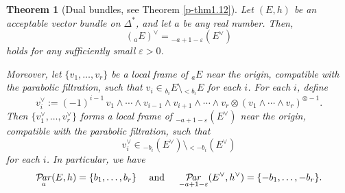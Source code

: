 \documentclass[12pt,twoside]{amsart}
\DeclareMathOperator{\Par}{\mathcal{P}\!\it{ar}}
\newtheorem{thm}{Theorem}[section]
\theoremstyle{definition}
\begin{document}
\begin{thm}[Dual bundles, see Theorem \ref{p-thm1.12}]\label{p-thm13.2}
Let $(E, h)$ be an acceptable vector bundle on $\Delta^*$, 
and let $a$ be any real number. Then,
\[
\left({}_a E\right)^\vee = {}_{-a + 1 - \varepsilon}\left(E^\vee\right)
\]
holds for any sufficiently small $\varepsilon > 0$. 

Moreover, let $\{v_1, \ldots, v_r\}$ be a local frame of ${}_a E$ near the origin, 
compatible with the parabolic filtration, such that 
$v_i \in {}_{b_i} E \setminus {}_{<b_i} E$ for each $i$. 
For each $i$, define
\begin{equation}\label{p-eq13.1}
v_i^\vee := (-1)^{i-1} \, v_1 \wedge 
\cdots \wedge v_{i-1} \wedge v_{i+1} \wedge 
\cdots \wedge v_r \otimes (v_1 \wedge \cdots \wedge v_r)^{\otimes -1}.
\end{equation}
Then $\{v_1^\vee, \ldots, v_r^\vee\}$ forms a local frame of ${}_{-a + 1 - \varepsilon}(E^\vee)$ 
near the origin, compatible with the parabolic filtration, such that 
\[
v_i^\vee \in {}_{-b_i}(E^\vee) \setminus {}_{<-b_i}(E^\vee)
\]
for each $i$. In particular, we have 
\[
\Par _a(E, h)=\{b_1, \ldots, b_r\} \quad 
\text{ and }\quad \Par _{-a+1-\varepsilon} (E^\vee, h^\vee)=\{ -b_1, \ldots, -b_r\}. 
\]
\end{thm}
\end{document}
